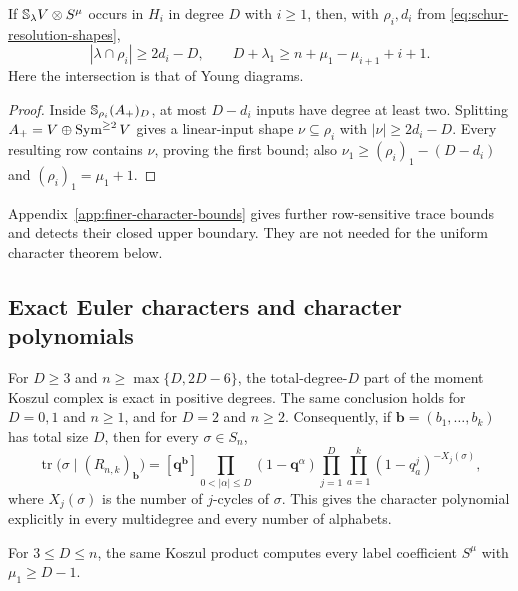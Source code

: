 \begin{proposition}
\label{prop:moment-intersection-support}
If $\mathbb S_\lambda V\otimes S^\mu$ occurs in $H_i$ in degree $D$
with $i\ge1$,
then, with $\rho_i,d_i$ from \eqref{eq:schur-resolution-shapes},
\[
 |\lambda\cap\rho_i|\ge2d_i-D,\qquad
 D+\lambda_1\ge n+\mu_1-\mu_{i+1}+i+1.
\]
Here the intersection is that of Young diagrams.
\end{proposition}
\begin{proof}
Inside $\mathbb S_{\rho_i}(A_+)_D$, at most $D-d_i$ inputs have degree
at least two. Splitting $A_+=V\oplus\operatorname{Sym}^{\ge2}V$ gives a
linear-input shape $\nu\subseteq\rho_i$ with $|\nu|\ge2d_i-D$.
Every resulting row contains $\nu$, proving the first bound; also
$\nu_1\ge(\rho_i)_1-(D-d_i)$ and $(\rho_i)_1=\mu_1+1$.
\end{proof}

Appendix~\ref{app:finer-character-bounds} gives further row-sensitive
trace bounds and detects their closed upper boundary. They are not
needed for the uniform character theorem below.




\subsection{Exact Euler characters and character polynomials}
\label{sec:exact-euler-characters}

\begin{theorem}
\label{thm:explicit-stable-character-polynomials}
For $D\ge3$ and $n\ge\max\{D,2D-6\}$, the total-degree-$D$ part of
the moment Koszul complex is exact in positive degrees.
The same conclusion holds for $D=0,1$ and $n\ge1$, and
for $D=2$ and $n\ge2$.
Consequently, if $\mathbf b=(b_1,\ldots,b_k)$ has total
size $D$, then for every $\sigma\in S_n$,
\begin{equation}\label{eq:explicit-stable-character-polynomial}
 \operatorname{tr}\bigl(\sigma\mid(R_{n,k})_{\mathbf b}\bigr)
 = [\mathbf q^{\mathbf b}]
   \prod_{0<|\alpha|\le D}(1-\mathbf q^\alpha)
   \prod_{j=1}^{D}\prod_{a=1}^{k}
                 (1-q_a^j)^{-X_j(\sigma)},
\end{equation}
where $X_j(\sigma)$ is the number of $j$-cycles of $\sigma$.
This gives the character polynomial explicitly in every
multidegree and every number of alphabets.

For $3\le D\le n$, the same Koszul product computes every
label coefficient $S^\mu$ with $\mu_1\ge D-1$.
\end{theorem}

